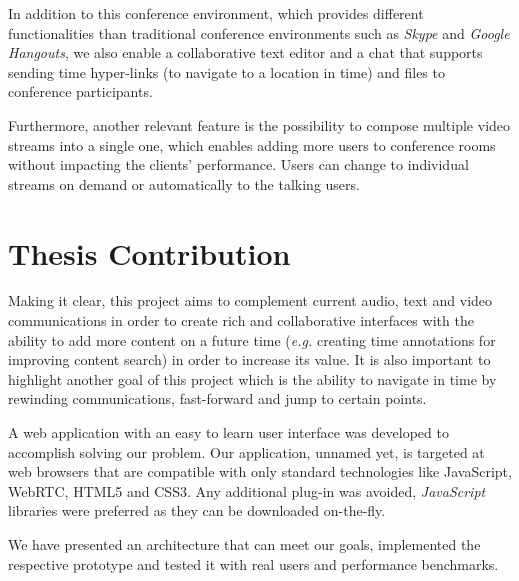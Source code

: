 	In addition to this conference environment, which provides different functionalities than traditional conference environments such as \emph{Skype} and \emph{Google Hangouts}, we also enable a collaborative text editor and a chat that supports sending time hyper-links (to navigate to a location in time) and files to conference participants.

	Furthermore, another relevant feature is the possibility to compose multiple video streams into a single one, which enables adding more users to conference rooms without impacting the clients' performance. Users can change to individual streams on demand or automatically to the talking users.
        

\section{Thesis Contribution}
\label{section:contribution}

Making it clear, this project aims to complement current audio, text and video communications in order to create rich and collaborative interfaces with the ability to add more content on a future time (\emph{e.g.} creating time annotations for improving content search) in order to increase its value. It is also important to highlight another goal of this project which is the ability to navigate in time by rewinding communications, fast-forward and jump to certain points.


A web application with an easy to learn user interface was developed to accomplish solving our problem. Our application, unnamed yet, is targeted at web browsers that are compatible with only standard technologies like JavaScript, \ac{WebRTC}, \ac{HTML}5 and \ac{CSS}3. Any additional plug-in was avoided, \emph{JavaScript} libraries were preferred as they can be downloaded on-the-fly.


	We have presented an architecture that can meet our goals, implemented the respective prototype and tested it with real users and performance benchmarks.

